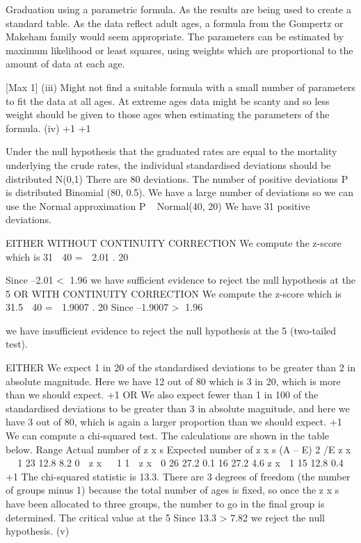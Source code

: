 \documentclass[a4paper,12pt]{article}
\begin{document}
\begin{enumerate}[(a)]
[Max 3]
Graduation using a parametric formula. 
As the results are being used to create a standard table. 
As the data reflect adult ages, a formula from the Gompertz or Makeham family would seem appropriate. 
The parameters can be estimated by maximum likelihood or least squares, using weights which are proportional to the amount of data at each age.

[Max 1]
(iii)
Might not find a suitable formula with a small number of parameters
to fit the data at all ages.
At extreme ages data might be scanty and so less weight should be given to those ages when estimating the parameters of the formula.
(iv)
+1
+1

Under the null hypothesis that the graduated rates are equal to the mortality underlying the crude rates, 
the individual standardised deviations should be distributed N(0,1) 
There are 80 deviations. 
The number of positive deviations P is distributed Binomial (80, 0.5). 
We have a large number of deviations so
we can use the Normal approximation 
P ~ Normal(40, 20)
We have 31 positive deviations.

EITHER WITHOUT CONTINUITY CORRECTION
We compute the z-score which is
31  40
\;=\;  2.01 .
20

Since –2.01 < 1.96 
we have sufficient evidence to reject the null hypothesis at the
5%
OR WITH CONTINUITY CORRECTION
We compute the z-score which is
31.5  40
\;=\;  1.9007 .
20
Since –1.9007 > 1.96


we have insufficient evidence to reject the null hypothesis at the 5%
(two-tailed test).

EITHER
We expect 1 in 20 of the standardised deviations
to be greater than 2 in absolute magnitude. Here we have
12 out of 80 which is 3 in 20, which is more than we should expect.
+1
OR
We also expect fewer than 1 in 100 of the standardised
deviations to be greater than 3 in absolute magnitude, and here
we have 3 out of 80, which is again a larger proportion than we
should expect.
+1
We can compute a chi-squared test. The calculations are shown in the table
below.
Range Actual number
of z x s Expected number
of z x s (A – E) 2 /E
z x   1 23 12.8 8.2
0  z x   1
1  z x  0 26 27.2 0.1
16 27.2 4.6
z x  1 15 12.8 0.4
+1
The chi-squared statistic is 13.3. 
There are 3 degrees of freedom (the number of groups minus 1) 
because the total number of ages is fixed, so once the z x s have been
allocated to three groups, the number to go in the final group is
determined. 
The critical value at the 5%
Since 13.3 > 7.82 we reject the null hypothesis.
(v)


\end{enumerate}
\end{document}
